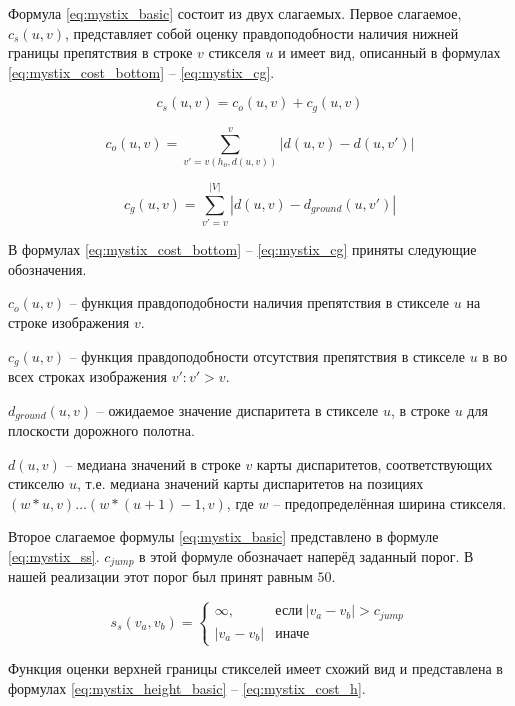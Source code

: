 \documentclass[aps,%
14pt,%
final,%
oneside,
onecolumn,%
musixtex, %
superscriptaddress,%
centertags]{extarticle} %
\begin{document}
Формула \ref{eq:mystix_basic} состоит из двух слагаемых. Первое слагаемое, $c_s(u, v)$, представляет собой оценку правдоподобности наличия нижней границы препятствия в строке $v$ стикселя $u$ и имеет вид, описанный в формулах \ref{eq:mystix_cost_bottom} -- \ref{eq:mystix_cg}. 

\begin{equation}\label{eq:mystix_cost_bottom}
c_s(u, v) = c_o(u, v) + c_g(u, v)
\end{equation}

\begin{equation}\label{eq:mystix_co}
c_o(u, v) = \sum_{v'=v(h_o, d(u, v))}^{v} |d(u, v) - d(u, v')|
\end{equation}

\begin{equation}\label{eq:mystix_cg}
c_g(u, v) = \sum_{v'=v}^{|V|} |d(u, v) - d_{ground}(u, v')|
\end{equation}

В формулах \ref{eq:mystix_cost_bottom} -- \ref{eq:mystix_cg} приняты следующие обозначения.

$c_o(u, v)$ -- функция правдоподобности наличия препятствия в стикселе $u$ на строке изображения $v$.

$c_g(u, v)$ -- функция правдоподобности отсутствия препятствия в стикселе $u$ в во всех строках изображения $v' : v' > v$.

$d_{ground}(u, v)$ -- ожидаемое значение диспаритета в стикселе $u$, в строке $u$ для плоскости дорожного полотна.

$d(u, v)$ -- медиана значений в строке $v$ карты диспаритетов, соответствующих стикселю $u$, т.е. медиана значений карты диспаритетов на позициях $(w * u, v)\dots (w * (u + 1) - 1, v)$, где $w$ -- предопределённая ширина стикселя.

Второе слагаемое формулы \ref{eq:mystix_basic} представлено в формуле \ref{eq:mystix_ss}. $c_{jump}$ в этой формуле обозначает наперёд заданный порог. В нашей реализации этот порог был принят равным $50$.

\begin{equation}\label{eq:mystix_ss}
s_s(v_a, v_b)=
\begin{cases}
  \infty,     & \text{если}\ |v_a - v_b| > c_{jump} \\
  |v_a - v_b| & \text{иначе}
\end{cases}
\end{equation}

Функция оценки верхней границы стикселей имеет схожий вид и представлена в формулах \ref{eq:mystix_height_basic} -- \ref{eq:mystix_cost_h}.
\end{document}
